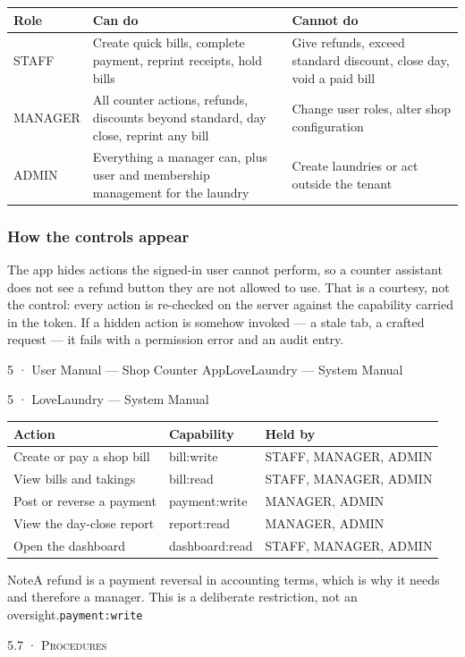 \documentclass[11pt,a4paper,oneside]{book}
\begin{document}
\begin{center}\small
\begin{tabularx}{\linewidth}{|X|X|X|}
\hline
\rowcolor{lightgrey}
\textbf{Role} & \textbf{Can do} & \textbf{Cannot do} \\ \hline
STAFF & Create quick bills, complete payment, reprint receipts, hold bills & Give refunds, exceed standard discount, close day, void a paid bill \\ \hline
MANAGER & All counter actions, refunds, discounts beyond standard, day close, reprint any bill & Change user roles, alter shop configuration \\ \hline
ADMIN & Everything a manager can, plus user and membership management for the laundry & Create laundries or act outside the tenant \\ \hline
\end{tabularx}
\end{center}
\subsubsection*{How the controls appear}
The app hides actions the signed-in user cannot perform, so a counter assistant does not see a refund button they are not allowed to use. That is a courtesy, not the control: every action is re-checked on the server against the capability carried in the token. If a hidden action is somehow invoked — a stale tab, a crafted request — it fails with a permission error and an audit entry.

5 · User Manual — Shop Counter AppLoveLaundry — System Manual

5 · LoveLaundry — System Manual

\begin{center}\small
\begin{tabularx}{\linewidth}{|X|X|X|}
\hline
\rowcolor{lightgrey}
\textbf{Action} & \textbf{Capability} & \textbf{Held by} \\ \hline
Create or pay a shop bill & bill:write & STAFF, MANAGER, ADMIN \\ \hline
View bills and takings & bill:read & STAFF, MANAGER, ADMIN \\ \hline
Post or reverse a payment & payment:write & MANAGER, ADMIN \\ \hline
View the day-close report & report:read & MANAGER, ADMIN \\ \hline
Open the dashboard & dashboard:read & STAFF, MANAGER, ADMIN \\ \hline
\end{tabularx}
\end{center}
\begin{notebox}NoteA refund is a payment reversal in accounting terms, which is why it needs  and therefore a manager. This is a deliberate restriction, not an oversight.\texttt{payment:write}\end{notebox}
\textsc{\small\color{crimson}5.7 · Procedures}\par\medskip
\end{document}
